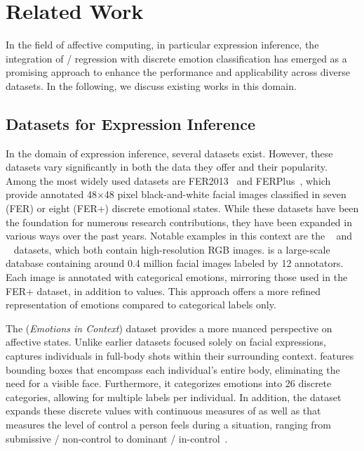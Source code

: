 \section{Related Work}
\label{sec:relatedwork}

In the field of affective computing, in particular expression inference, the integration of \val{}/\aro{} regression with discrete emotion classification has emerged as a promising approach to enhance the performance and applicability across diverse datasets. In the following, we discuss existing works in this domain.

\subsection{Datasets for Expression Inference}

In the domain of expression inference, several datasets exist. However, these datasets vary significantly in both the data they offer and their popularity.
Among the most widely used datasets are FER2013~\cite{goodfellow_challenges_2013} and FERPlus~\cite{barsoum_training_2016}, which provide annotated 48$\times$48 pixel black-and-white facial images classified in seven (FER) or eight (FER+) discrete emotional states. 
While these datasets have been the foundation for numerous research contributions, they have been expanded in various ways over the past years. Notable examples in this context are the \emotic{}~\cite{kosti_emotic_2017} and \affectnet{}~\cite{mollahosseini2017affectnet} datasets, which both contain high-resolution RGB images.
\affectnet{} is a large-scale database containing around 0.4 million facial images labeled by 12 annotators. Each image is annotated with categorical emotions, mirroring those used in the FER+ dataset, in addition to \va{}  values. This approach offers a more refined representation of emotions compared to categorical labels only. 

The \emotic{} (\textit{Emotions in Context}) dataset provides a more nuanced perspective on affective states. Unlike earlier datasets focused solely on facial expressions, \emotic{} captures individuals in full-body shots within their surrounding context. \emotic{}  features bounding boxes that encompass each individual's entire body, eliminating the need for a visible face. Furthermore, it categorizes emotions into 26 discrete categories, allowing for multiple labels per individual. In addition, the dataset expands these discrete values with continuous measures of \va{} as well as \dom{} that measures the level of control a person feels during a situation, ranging from submissive / non-control to dominant / in-control~\cite{emotic_pami2019}. 

